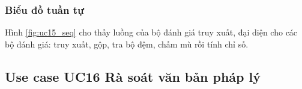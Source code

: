\documentclass[../DoAn.tex]{subfiles}
\begin{document}

\subsubsection{Biểu đồ tuần tự}
Hình \ref{fig:uc15_seq} cho thấy luồng của bộ đánh giá truy xuất, đại diện cho các bộ đánh giá: truy xuất, gộp, tra bộ đệm, chấm mù rồi tính chỉ số.



\subsection{Use case UC16 Rà soát văn bản pháp lý}
\label{subsection:uc16}
\end{document}
